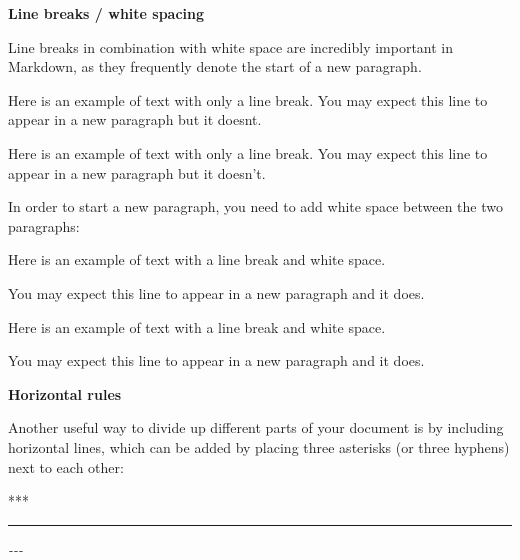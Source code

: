 \documentclass[]{tufte-book}
\newenvironment{Shaded}{\begin{snugshade}}{\end{snugshade}}
\newcommand{\CommentTok}[1]{\textcolor[rgb]{0.56,0.35,0.01}{\textit{#1}}}
\newcommand{\NormalTok}[1]{#1}
\begin{document}
\textbf{Line breaks / white spacing}

Line breaks in combination with white space are incredibly important in Markdown, as they frequently denote the start of a new paragraph.

\begin{Shaded}
\begin{Highlighting}[]
\NormalTok{Here is an example of text with only a line break.}
\NormalTok{You may expect this line to appear in a new paragraph but it doesn\textquotesingle{}t.}
\end{Highlighting}
\end{Shaded}

Here is an example of text with only a line break.
You may expect this line to appear in a new paragraph but it doesn't.

In order to start a new paragraph, you need to add white space between the two paragraphs:

\begin{Shaded}
\begin{Highlighting}[]
\NormalTok{Here is an example of text with a line break and white space.}

\NormalTok{You may expect this line to appear in a new paragraph and it does.}
\end{Highlighting}
\end{Shaded}

Here is an example of text with a line break and white space.

You may expect this line to appear in a new paragraph and it does.

\textbf{Horizontal rules}

Another useful way to divide up different parts of your document is by including horizontal lines, which can be added by placing three asterisks (or three hyphens) next to each other:

\begin{Shaded}
\begin{Highlighting}[]
\NormalTok{***}
\end{Highlighting}
\end{Shaded}

\begin{center}\rule{0.5\linewidth}{0.5pt}\end{center}

\begin{Shaded}
\begin{Highlighting}[]
\CommentTok{{-}{-}{-}}
\end{Highlighting}
\end{Shaded}
\end{document}

